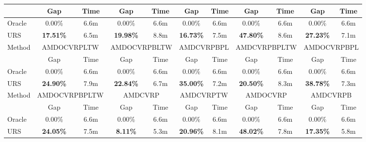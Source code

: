 \documentclass{article}
\theoremstyle{plain}
\theoremstyle{definition}
\theoremstyle{remark}
\begin{document}
\begin{table}[htbp]
{\begin{tabular}{l|cc|cc|cc|cc|cc}
          & Gap   & Time  & Gap   & Time  & Gap   & Time  & Gap   & \multicolumn{1}{c|}{Time} & Gap   & \multicolumn{1}{c}{Time} \\
    \midrule
    Oracle & 0.00\% & 6.6m  & 0.00\% & 6.6m  & 0.00\% & 6.6m  & 0.00\% & \multicolumn{1}{c|}{6.6m} & 0.00\% & \multicolumn{1}{c}{6.6m} \\
    URS   & \cellcolor[HTML]{D0CECE}\textbf{17.51\%} & 6.5m  & \cellcolor[HTML]{D0CECE}\textbf{19.98\%} & 8.8m  & \cellcolor[HTML]{D0CECE}\textbf{16.73\%} & 7.5m  & \cellcolor[HTML]{D0CECE}\textbf{47.80\%} & \multicolumn{1}{c|}{8.6m} & \cellcolor[HTML]{D0CECE}\textbf{27.23\%} & \multicolumn{1}{c}{7.1m} \\
    \midrule
    \midrule
    \multirow{2}[2]{*}{Method} & \multicolumn{2}{c|}{AMDOCVRPLTW} & \multicolumn{2}{c|}{AMDOCVRPBLTW} & \multicolumn{2}{c|}{AMDCVRPBPL} & \multicolumn{2}{c|}{AMDCVRPBPLTW} & \multicolumn{2}{c}{AMDOCVRPBPL} \\
          & Gap   & Time  & Gap   & Time  & Gap   & Time  & Gap   & \multicolumn{1}{c|}{Time} & Gap   & \multicolumn{1}{c}{Time} \\
    \midrule
    Oracle & 0.00\% & 6.6m  & 0.00\% & 6.6m  & 0.00\% & 6.6m  & 0.00\% & \multicolumn{1}{c|}{6.6m} & 0.00\% & \multicolumn{1}{c}{6.6m} \\
    URS   & \cellcolor[HTML]{D0CECE}\textbf{24.90\%} & 7.9m  & \cellcolor[HTML]{D0CECE}\textbf{22.84\%} & 6.7m  &  \cellcolor[HTML]{D0CECE}\textbf{35.00\%} & 7.2m  &  \cellcolor[HTML]{D0CECE}\textbf{20.50\%} & \multicolumn{1}{c|}{8.3m} &  \cellcolor[HTML]{D0CECE}\textbf{38.78\%} & \multicolumn{1}{c}{7.3m} \\
    \midrule
    \midrule
    \multirow{2}[2]{*}{Method} & \multicolumn{2}{c|}{AMDOCVRPBPLTW} & \multicolumn{2}{c|}{AMDCVRP} & \multicolumn{2}{c|}{AMDCVRPTW} & \multicolumn{2}{c|}{AMDOCVRP} & \multicolumn{2}{c}{AMDCVRPB} \\
          & Gap   & Time  & Gap   & Time  & Gap   & Time  & Gap   & \multicolumn{1}{c|}{Time} & Gap   & \multicolumn{1}{c}{Time} \\
    \midrule
    Oracle & 0.00\% & 6.6m  & 0.00\% & 6.6m  & 0.00\% & 6.6m  & 0.00\% & \multicolumn{1}{c|}{6.6m} & 0.00\% & \multicolumn{1}{c}{6.6m} \\
    URS   &  \cellcolor[HTML]{D0CECE}\textbf{24.05\%} & 7.5m  &  \cellcolor[HTML]{D0CECE}\textbf{8.11\%} & 5.3m  & \cellcolor[HTML]{D0CECE}\textbf{20.96\%} & 8.1m  & \cellcolor[HTML]{D0CECE}\textbf{48.02\%} & \multicolumn{1}{c|}{7.8m} & \cellcolor[HTML]{D0CECE}\textbf{17.35\%} & \multicolumn{1}{c}{5.8m} \\

\end{tabular}}
\end{table}
\end{document}
